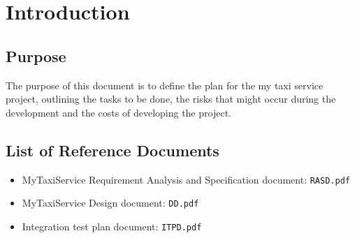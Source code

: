 \section{Introduction}

\subsection{Purpose}
The purpose of this document is to define the plan for the my taxi service project, outlining the tasks to be done, the risks that might occur during the development and the costs of developing the project.


\subsection{List of Reference Documents}
\begin{itemize}
	\item MyTaxiService Requirement Analysis and Specification document: \texttt{RASD.pdf}
	\item MyTaxiService Design document:  \texttt{DD.pdf}
	\item Integration test plan document: 	\texttt{ITPD.pdf}
\end{itemize}
